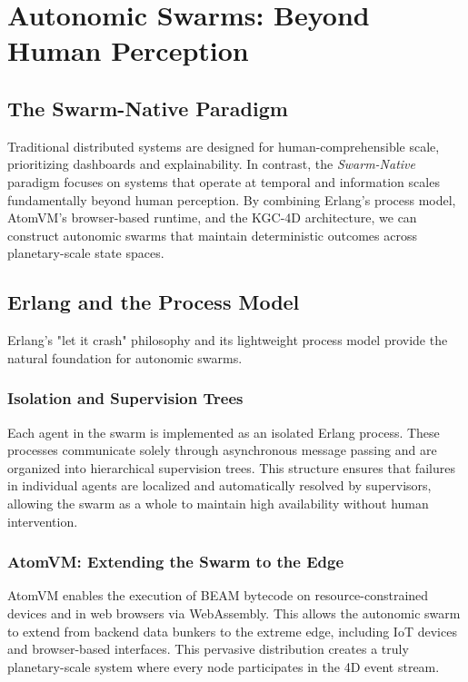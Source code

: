 \chapter{Autonomic Swarms: Beyond Human Perception}
\label{ch:autonomic_swarms}

\section{The Swarm-Native Paradigm}

Traditional distributed systems are designed for human-comprehensible scale, prioritizing dashboards and explainability. In contrast, the \textit{Swarm-Native} paradigm focuses on systems that operate at temporal and information scales fundamentally beyond human perception. By combining Erlang's process model, AtomVM's browser-based runtime, and the KGC-4D architecture, we can construct autonomic swarms that maintain deterministic outcomes across planetary-scale state spaces.

\section{Erlang and the Process Model}

Erlang's "let it crash" philosophy and its lightweight process model provide the natural foundation for autonomic swarms.

\subsection{Isolation and Supervision Trees}
Each agent in the swarm is implemented as an isolated Erlang process. These processes communicate solely through asynchronous message passing and are organized into hierarchical supervision trees. This structure ensures that failures in individual agents are localized and automatically resolved by supervisors, allowing the swarm as a whole to maintain high availability without human intervention.

\subsection{AtomVM: Extending the Swarm to the Edge}
AtomVM enables the execution of BEAM bytecode on resource-constrained devices and in web browsers via WebAssembly. This allows the autonomic swarm to extend from backend data bunkers to the extreme edge, including IoT devices and browser-based interfaces. This pervasive distribution creates a truly planetary-scale system where every node participates in the 4D event stream.

